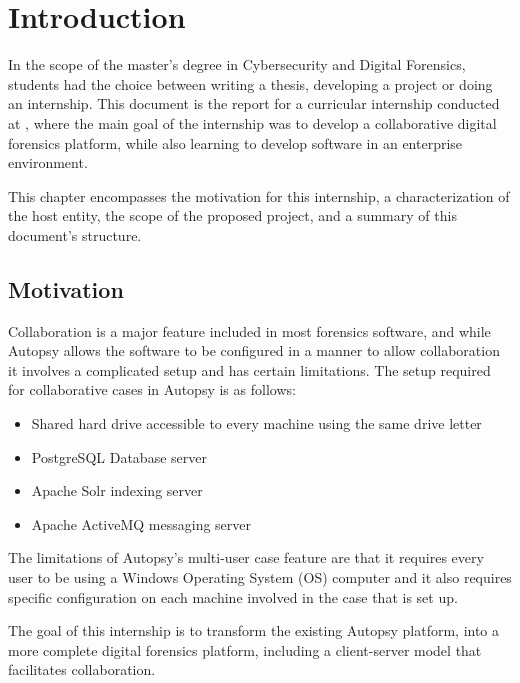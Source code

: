 
\chapter{Introduction}
\label{ch:introduction}

In the scope of the master's degree in Cybersecurity and Digital Forensics, students had the choice between writing a thesis, developing a project or doing an internship.
This document is the report for a curricular internship conducted at \company, where the main goal of the internship was to develop a collaborative digital forensics platform,
while also learning to develop software in an enterprise environment.

This chapter encompasses the motivation for this internship, a characterization of the host entity, the scope of the proposed project, and a summary of this document's structure.

\section{Motivation}

Collaboration is a major feature included in most forensics software, and while Autopsy \cite{autopsy} allows the software to be
configured in a manner to allow collaboration it involves a complicated setup and has certain limitations.
The setup required for collaborative cases in Autopsy is as follows:
\begin{itemize}
 \item Shared hard drive accessible to every machine using the same drive letter
 \item PostgreSQL \cite{postgresql} Database server 
 \item Apache Solr \cite{solr} indexing server
 \item Apache ActiveMQ \cite{activemq} messaging server
\end{itemize}

The limitations of Autopsy's multi-user case feature are that it requires every user to be using a Windows Operating System (OS) computer and it also requires specific configuration on each
machine involved in the case that is set up.

The goal of this internship is to transform the existing Autopsy platform, into a more complete digital forensics platform, including a client-server model that facilitates collaboration.

